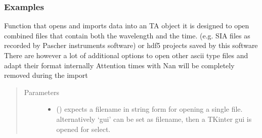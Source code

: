 \documentclass[letterpaper,10pt,english]{sphinxmanual}
\begin{document}
\begin{fulllineitems}
\begin{fulllineitems}
\begin{quote}
\begin{description}
\begin{itemize}
\end{itemize}

\end{description}\end{quote}
\subsubsection*{Examples}

\begin{sphinxVerbatim}[commandchars=\\\{\}]
\end{sphinxVerbatim}

\end{fulllineitems}


\begin{fulllineitems}
\label{\detokenize{plot_func:plot_func.TA.__init__}}
Function that opens and imports data into an TA object
it is designed to open combined files that contain both the wavelength and the time. (e.g. SIA files as recorded by Pascher instruments software) or hdf5 projects saved by this software
There are however a lot of additional options to open other ascii type files and adapt their format internally
Attention times with Nan will be completely removed during the import
\begin{quote}\begin{description}
\item[{Parameters}] \leavevmode\begin{itemize}
\item {} 
 () \textendash{} expects a filename in string form for opening a single file. alternatively ‘gui’ can be set as
filename, then a TKinter gui is opened for select.


\end{itemize}
\end{description}
\end{quote}
\end{fulllineitems}
\end{fulllineitems}
\end{document}
